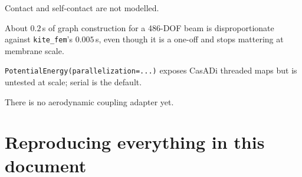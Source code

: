 \documentclass[11pt,a4paper]{article}
\newcommand{\code}[1]{\texttt{\small #1}}
\begin{document}
\begin{description}[style=unboxed,leftmargin=1.2em]
\item[No contact.] Contact and self-contact are not modelled.

\item[Setup cost.] About $0.2$\,s of graph construction for a 486-DOF beam is
disproportionate against \code{kite\_fem}'s $0.005$\,s, even though it is a
one-off and stops mattering at membrane scale.

\item[Threaded assembly.] \code{PotentialEnergy(parallelization=...)} exposes
CasADi threaded maps but is untested at scale; serial is the default.

\item[Not coupled.] There is no aerodynamic coupling adapter yet.
\end{description}

\section{Reproducing everything in this document}
\end{document}
